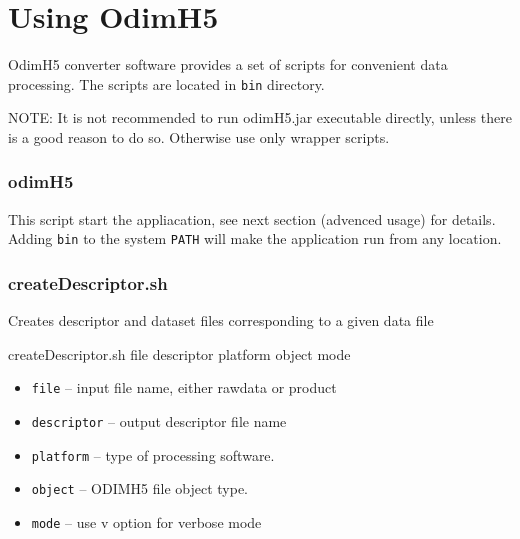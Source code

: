 \documentclass[11p]{article}
\begin{document}
\section{Using OdimH5}

OdimH5 converter software provides a set of scripts for convenient data 
processing. The scripts are located in \texttt{bin} directory.
\begin{uwaga}
NOTE: It is not recommended to run odimH5.jar executable directly, unless there
is a good reason to do so. Otherwise use only wrapper scripts.
\end{uwaga}

\subsubsection*{odimH5}
This script start the appliacation, see next section (advenced usage) for
details. Adding \texttt{bin} to the system \texttt{PATH} will make the
application run from any location.

\subsubsection*{createDescriptor.sh} 
Creates descriptor and dataset files
corresponding to a given data file  

\begin{kod}
createDescriptor.sh file descriptor platform object mode
\end{kod}
\begin{itemize}
    \item\texttt{file} -- input file name, either rawdata or product
    \item\texttt{descriptor} -- output descriptor file name
    \item\texttt{platform}  -- type of processing software.
    \item\texttt{object} -- ODIMH5 file object type.
    \item\texttt{mode} -- use v option for verbose mode
\end{itemize}
\end{document}
